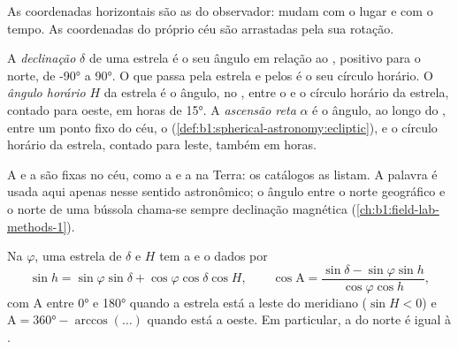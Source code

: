 As coordenadas horizontais são as do observador: mudam com o lugar e com o tempo. As coordenadas do próprio céu são arrastadas pela sua rotação.

\begin{definition}\label{def:b1:spherical-astronomy:equatorial}
A \emph{declinação} $\delta$ de uma estrela é o seu ângulo em relação ao , positivo para o norte, de \ang{-90} a \ang{90}. O  que passa pela estrela e pelos  é o seu círculo horário. O \emph{ângulo horário} $H$ da estrela é o ângulo, no , entre o  e o círculo horário da estrela, contado para oeste, em horas de \ang{15}. A \emph{ascensão reta} $\alpha$ é o ângulo, ao longo do , entre um ponto fixo do céu, o  (\cref{def:b1:spherical-astronomy:ecliptic}), e o círculo horário da estrela, contado para leste, também em horas.
\end{definition}

A  e a  são fixas no céu, como a  e a  na Terra: os catálogos as listam. A palavra  é usada aqui apenas nesse sentido astronômico; o ângulo entre o norte geográfico e o norte de uma bússola chama-se sempre declinação magnética (\cref{ch:b1:field-lab-methods-1}).

\begin{proposition}\label{prop:b1:spherical-astronomy:transform}
Na  $\varphi$, uma estrela de  $\delta$ e  $H$ tem a  e o  dados por
\[
  \sin h = \sin\varphi\sin\delta + \cos\varphi\cos\delta\cos H,
  \qquad
  \cos\mathrm{A} = \frac{\sin\delta - \sin\varphi\sin h}{\cos\varphi\cos h},
\]
com $\mathrm{A}$ entre \ang{0} e \ang{180} quando a estrela está a leste do meridiano ($\sin H < 0$) e $\mathrm{A} = \ang{360} - \arccos(\dots)$ quando está a oeste. Em particular, a  do  norte é igual à .
\end{proposition}

